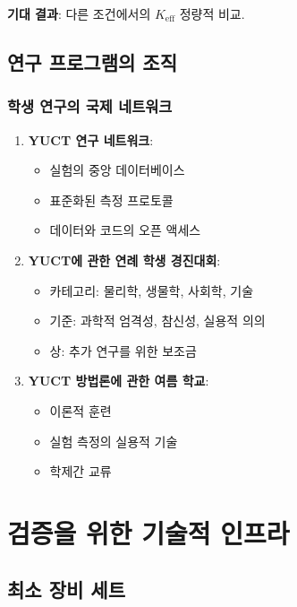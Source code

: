 \documentclass[12pt,a4paper]{article}
\begin{document}
	\textbf{기대 결과}: 다른 조건에서의 $K_{\mathrm{eff}}$ 정량적 비교.
	
	\subsection{연구 프로그램의 조직}
	
	\subsubsection{학생 연구의 국제 네트워크}
	
	\begin{enumerate}
		\item \textbf{YUCT 연구 네트워크}:
		\begin{itemize}
			\item 실험의 중앙 데이터베이스
			\item 표준화된 측정 프로토콜
			\item 데이터와 코드의 오픈 액세스
		\end{itemize}
		
		\item \textbf{YUCT에 관한 연례 학생 경진대회}:
		\begin{itemize}
			\item 카테고리: 물리학, 생물학, 사회학, 기술
			\item 기준: 과학적 엄격성, 참신성, 실용적 의의
			\item 상: 추가 연구를 위한 보조금
		\end{itemize}
		
		\item \textbf{YUCT 방법론에 관한 여름 학교}:
		\begin{itemize}
			\item 이론적 훈련
			\item 실험 측정의 실용적 기술
			\item 학제간 교류
		\end{itemize}
	\end{enumerate}
	
	\section{검증을 위한 기술적 인프라}
	
	\subsection{최소 장비 세트}
	
\end{document}
